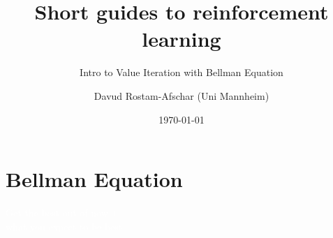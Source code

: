 \documentclass[11pt,table]{beamer}
\title[]{Short guides to reinforcement learning}
\subtitle[]{Intro to Value Iteration with Bellman Equation}
\author[D. Rostam-Afschar]{\textcolor{gray1}{Davud Rostam-Afschar (Uni Mannheim)}}
\date[]{\today}
\begin{document}
\begin{frame}[plain]
  \titlepage
\end{frame}


\section{Bellman Equation}
{
\begin{frame}
\centering
\Huge
\textcolor{white}{Get the best out of now +\\ what you expect to be best}
\thispagestyle{empty}
\end{frame}
}
\end{document}
